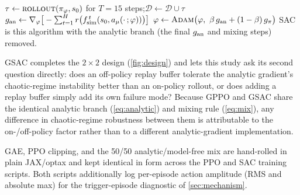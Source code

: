 \begin{algorithm}[t]
\caption{GSAC --- one training episode ($\beta=0.5$, $H=6$)}
\label{alg:gsac}
\DontPrintSemicolon
{}
$\tau \leftarrow \textsc{rollout}(\pi_\varphi, s_0)$ for $T=15$ steps;\quad $\mathcal{D} \leftarrow \mathcal{D}\cup\tau$\;
$g_{\mathrm{an}} \leftarrow \nabla_\varphi\big[-\sum_{t=1}^{H} r\big(f_{\mathrm{sim}}^{\,t}(s_0,a_\mu(\cdot\,;\varphi))\big)\big]$\;
$\varphi \leftarrow \textsc{Adam}\big(\varphi,\ \beta\,g_{\mathrm{an}} + (1-\beta)\,g_\pi\big)$ 
SAC is this algorithm with the analytic branch (the final $g_{\mathrm{an}}$ and mixing steps) removed.
\end{algorithm}

GSAC completes the $2\times 2$ design
(\cref{fig:design}) and lets this study ask its second question directly:
does an off-policy replay buffer tolerate the analytic gradient's
chaotic-regime instability better than an on-policy rollout, or does adding
a replay buffer simply add its own failure mode? Because GPPO and GSAC
share the identical analytic branch (\cref{eq:analytic}) and mixing rule
(\cref{eq:mix}), any difference in chaotic-regime robustness between them is
attributable to the on-/off-policy factor rather than to a different
analytic-gradient implementation.

GAE, PPO clipping, and the 50/50
analytic/model-free mix are hand-rolled in plain JAX/optax and kept
identical in form across the PPO and SAC training scripts. Both scripts
additionally log per-episode action amplitude (RMS and absolute max) for the
trigger-episode diagnostic of \cref{sec:mechanism}.
